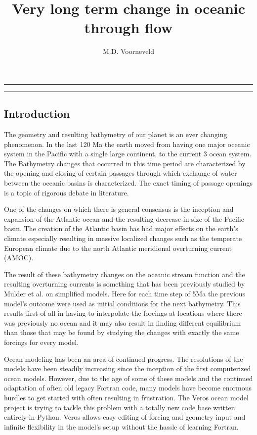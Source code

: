 \documentclass[a4paper]{article}
\title{Very long term change in oceanic through flow}
\author{M.D. Voorneveld}
\begin{document}
\maketitle
\noindent\rule{\textwidth}{1pt}
\begin{abstract}

\end{abstract}
\noindent\rule{\textwidth}{1pt}
\begin{multicols}{2}
\section{Introduction}

The geometry and resulting bathymetry of our planet is an ever changing phenomenon\cite{besse2002apparent}. In the last 120 Ma the earth moved from having one major oceanic system in the Pacific with a single large continent, to the current 3 ocean system. The Bathymetry changes that occurred in this time period are characterized by the opening and closing of certain passages through which exchange of water between the oceanic basins is characterized. The exact timing of passage openings is a topic of rigorous debate in literature\cite{Scher2006Apr}\cite{Schmidt2007Jan}.


One of the changes on which there is general consensus is the inception and expansion of the Atlantic ocean and the resulting decrease in size of the Pacific basin. The creation of the Atlantic basin has had major effects on the earth's climate especially resulting in massive localized changes such as the temperate European climate due to the north Atlantic meridional overturning current (AMOC).

The result of these bathymetry changes on the oceanic stream function and the resulting overturning currents is something that has been previously studied by Mulder et al.\cite{Mulder2017Jul} on simplified models. Here for each time step of 5Ma the previous model's outcome were used as initial conditions for the next bathymetry. This results first of all in having to interpolate the forcings at locations where there was previously no ocean and it may also result in finding different equilibrium than those that may be found by studying the changes with exactly the same forcings for every model.

Ocean modeling has been an area of continued progress. The resolutions of the models have been steadily increasing since the inception of the first computerized ocean models. However, due to the age of some of these models and the continued adaptation of often old legacy Fortran code, many models have become enormous hurdles to get started with often resulting in frustration. The Veros\cite{Hafner2018Aug} ocean model project is trying to tackle this problem with a totally new code base written entirely in Python. Veros allows easy editing of forcing and geometry input and infinite flexibility in the model's setup without the hassle of learning Fortran.


\end{multicols}
\end{document}

